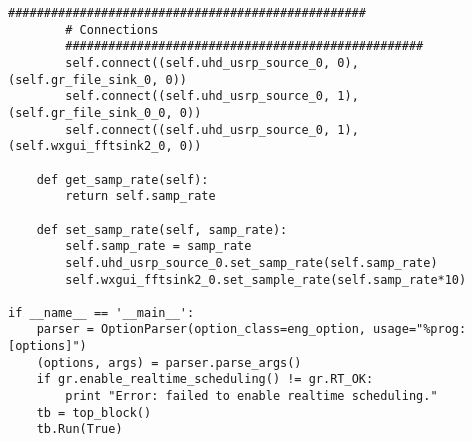 \begin{lstlisting}[breaklines]
		##################################################
		# Connections
		##################################################
		self.connect((self.uhd_usrp_source_0, 0), (self.gr_file_sink_0, 0))
		self.connect((self.uhd_usrp_source_0, 1), (self.gr_file_sink_0_0, 0))
		self.connect((self.uhd_usrp_source_0, 1), (self.wxgui_fftsink2_0, 0))

	def get_samp_rate(self):
		return self.samp_rate

	def set_samp_rate(self, samp_rate):
		self.samp_rate = samp_rate
		self.uhd_usrp_source_0.set_samp_rate(self.samp_rate)
		self.wxgui_fftsink2_0.set_sample_rate(self.samp_rate*10)

if __name__ == '__main__':
	parser = OptionParser(option_class=eng_option, usage="%prog: [options]")
	(options, args) = parser.parse_args()
	if gr.enable_realtime_scheduling() != gr.RT_OK:
		print "Error: failed to enable realtime scheduling."
	tb = top_block()
	tb.Run(True)



\end{lstlisting}


